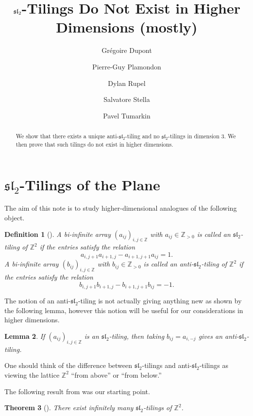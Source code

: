 \documentclass{amsart}
\author{Gr\'egoire Dupont}
\author{Pierre-Guy Plamondon}
\author{Dylan Rupel}
\author{Salvatore Stella}
\author{Pavel Tumarkin}
\title{$\fsl_2$-Tilings Do Not Exist in Higher Dimensions (mostly)}
\newtheorem{theorem}{Theorem}
\newtheorem{definition}[theorem]{Definition}
\newtheorem{lemma}[theorem]{Lemma}
\newcommand{\fsl}{\mathfrak{sl}}
\newcommand{\ZZ}{\mathbb{Z}}
\begin{document}
  \begin{abstract}
    We show that there exists a unique anti-$\fsl_2$-tiling and no $\fsl_2$-tilings in dimension 3.  We then prove that such tilings do not exist in higher dimensions.
  \end{abstract}
  \maketitle

  \section{$\fsl_2$-Tilings of the Plane}
  The aim of this note is to study higher-dimensional analogues of the following object.
    \begin{definition}[\cite{AssemReutenauerSmith}]
      A bi-infinite array $(a_{ij})_{i,j\in\ZZ}$ with $a_{ij}\in\ZZ_{>0}$ is called an \emph{$\fsl_2$-tiling of $\ZZ^2$} if the entries satisfy the relation
      \begin{equation}\label{eq:sl2 recursion}
        a_{i,j+1}a_{i+1,j}-a_{i+1,j+1}a_{ij}=1.
      \end{equation}
      A bi-infinite array $(b_{ij})_{i,j\in\ZZ}$ with $b_{ij}\in\ZZ_{>0}$  is called an \emph{anti-$\fsl_2$-tiling of $\ZZ^2$} if the entries satisfy the relation
      \begin{equation}\label{eq:anti-sl2 recursion}
        b_{i,j+1}b_{i+1,j}-b_{i+1,j+1}b_{ij}=-1.
      \end{equation}
    \end{definition}
    The notion of an anti-$\fsl_2$-tiling is not actually giving anything new as shown by the following lemma, however this notion will be useful for our considerations in higher dimensions.
    \begin{lemma}
      If $(a_{ij})_{i,j\in\ZZ}$ is an $\fsl_2$-tiling, then taking $b_{ij}=a_{i,-j}$ gives an anti-$\fsl_2$-tiling.
    \end{lemma}
    One should think of the difference between $\fsl_2$-tilings and anti-$\fsl_2$-tilings as viewing the lattice $\ZZ^2$ ``from above'' or ``from below.''
    
    The following result from \cite{AssemReutenauerSmith} was our starting point.
    \begin{theorem}[\cite{AssemReutenauerSmith}]
      There exist infinitely many $\fsl_2$-tilings of $\ZZ^2$.
    \end{theorem}
    
\end{document}
